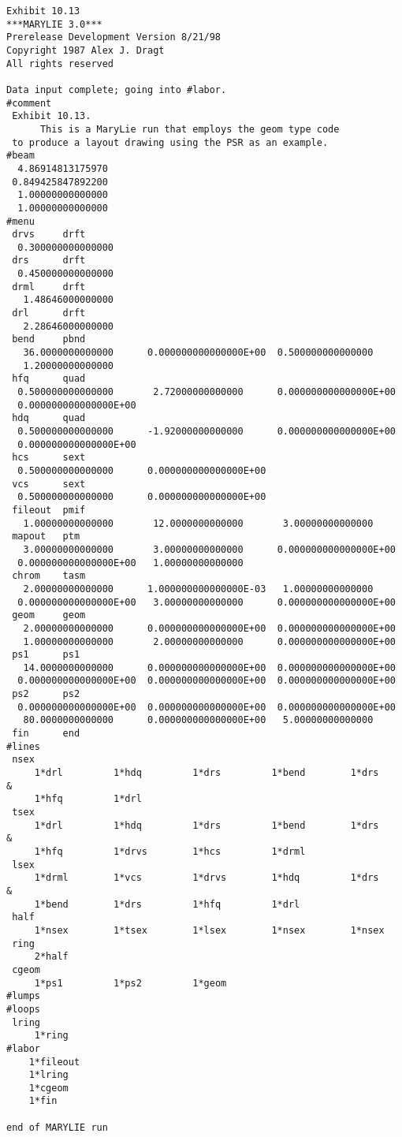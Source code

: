 \newpage
\begin{footnotesize}
\begin{verbatim}
Exhibit 10.13
***MARYLIE 3.0***
Prerelease Development Version 8/21/98
Copyright 1987 Alex J. Dragt
All rights reserved

Data input complete; going into #labor.
#comment
 Exhibit 10.13.
      This is a MaryLie run that employs the geom type code
 to produce a layout drawing using the PSR as an example.
#beam
  4.86914813175970
 0.849425847892200
  1.00000000000000
  1.00000000000000
#menu
 drvs     drft
  0.300000000000000
 drs      drft
  0.450000000000000
 drml     drft
   1.48646000000000
 drl      drft
   2.28646000000000
 bend     pbnd
   36.0000000000000      0.000000000000000E+00  0.500000000000000
   1.20000000000000
 hfq      quad
  0.500000000000000       2.72000000000000      0.000000000000000E+00
  0.000000000000000E+00
 hdq      quad
  0.500000000000000      -1.92000000000000      0.000000000000000E+00
  0.000000000000000E+00
 hcs      sext
  0.500000000000000      0.000000000000000E+00
 vcs      sext
  0.500000000000000      0.000000000000000E+00
 fileout  pmif
   1.00000000000000       12.0000000000000       3.00000000000000
 mapout   ptm
   3.00000000000000       3.00000000000000      0.000000000000000E+00
  0.000000000000000E+00   1.00000000000000
 chrom    tasm
   2.00000000000000      1.000000000000000E-03   1.00000000000000
  0.000000000000000E+00   3.00000000000000      0.000000000000000E+00
 geom     geom
   2.00000000000000      0.000000000000000E+00  0.000000000000000E+00
   1.00000000000000       2.00000000000000      0.000000000000000E+00
 ps1      ps1
   14.0000000000000      0.000000000000000E+00  0.000000000000000E+00
  0.000000000000000E+00  0.000000000000000E+00  0.000000000000000E+00
 ps2      ps2
  0.000000000000000E+00  0.000000000000000E+00  0.000000000000000E+00
   80.0000000000000      0.000000000000000E+00   5.00000000000000
 fin      end
#lines
 nsex
     1*drl         1*hdq         1*drs         1*bend        1*drs      &
     1*hfq         1*drl
 tsex
     1*drl         1*hdq         1*drs         1*bend        1*drs      &
     1*hfq         1*drvs        1*hcs         1*drml
 lsex
     1*drml        1*vcs         1*drvs        1*hdq         1*drs      &
     1*bend        1*drs         1*hfq         1*drl
 half
     1*nsex        1*tsex        1*lsex        1*nsex        1*nsex
 ring
     2*half
 cgeom
     1*ps1         1*ps2         1*geom
#lumps
#loops
 lring
     1*ring
#labor
    1*fileout
    1*lring
    1*cgeom
    1*fin

end of MARYLIE run
\end{verbatim}
\end{footnotesize}



